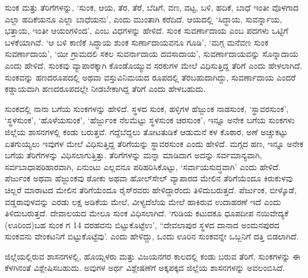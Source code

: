 ಸುಂಕ ಮತ್ತು ತೆರಿಗೆಗಳನ್ನು, ‘ಸುಂಕ, ಆಯ, ತೆರ, ತೆರೆ, ಬೆಡಿಗೆ, ವಣ, ವಟ್ಟ, ಬಳಿ, ಹದಿಕೆ, ಬಾಧೆ ಇಂತೀ ವೊಳಗಾದ ಎಲ್ಲಾ ಹದಿಕೆಯನೂ ಎಲ್ಲಾ ಬಾಧೆಯನು’, ಎಂದು ಮುಂತಾಗಿ ಕರೆದಿದೆ. ಆಯದಲ್ಲಿ ‘ಸಿದ್ಧಾಯ, ಸುವರ್ನ್ನಾಯ, ಭತ್ತಾಯ, ಇಂತೀ ಆಯಂಗಳಿಂದ’, ಎಂಬ ವಿಧಗಳನ್ನು ಹೇಳಿದೆ. ಸುಂಕ ಸುವರ್ಣಾದಾಯ ಎಂಬ ಪದಗಳು ಒಟ್ಟಿಗೆ ಬಳಕೆಯಾಗಿವೆ. ‘ಆ ಬಳಿ ಕಾಣಿಕೆ ಸಿದ್ಧಾಯ ಶುಂಕ ಸುರ್ಣಾದಾಯವನೂ ಗೂಡಿ’, ‘ಮಗ್ಗ ಮನೆವಣ ಸುಂಕ ಸುವರ್ಣಾದಾಯ’, ‘ಯೀ ಗ್ರಾಮದಲಿ ಸಕಲ ಸುವರ್ನಾದಾಯ ದವಸಾದಾಯ’, ಸುವರ್ಣಾದಾಯವನ್ನು ಸೊನ್ನಾದಾಯ ಎಂದು ಹೇಳಿದೆ. ಸುಂಕವು ವ್ಯಾಪಾರಕ್ಕಾಗಿ ಕೊಂಡೊಯ್ಯುವ ಸರಕುಗಳ ಮೇಲೆ ವಿಧಿಸುತ್ತಿದ್ದ ತೆರಿಗೆ ಎಂದು ಹೇಳಲಾಗಿದೆ. ಸುಂಕವನ್ನು ಹಣದರೂಪದಲ್ಲಿ ಅಥವಾ ವಸ್ತುವಿನಿಮಯದ ರೂಪದಲ್ಲಿ ತೆರಬಹುದಾಗಿದ್ದು, ಸುವರ್ಣಾದಾಯ ಎಂದರೆ ಕಡ್ಡಾಯವಾಗಿ ಹಣದರೂಪದಲ್ಲೇ ನೀಡಬೇಕಾಗಿದ್ದ ತೆರಿಗೆ ಎಂದು ಹೇಳಬಹುದು.

ಸುಂಕದಲ್ಲಿ ನಾನಾ ಬಗೆಯ ಸುಂಕಗಳನ್ನು ಹೇಳಿದೆ. ಸ್ಥಳದ ಸುಂಕ, ಹಳ್ಳಿಗಳ ಹೆಜ್ಜುಂಕ ನಾಡಸುಂಕ, ‘ಸ್ಥಾವರಸುಂಕ’, ‘ಸ್ಥಳಸುಂಕ’, ‘ಹೊಳೆಯಸುಂಕ’, ‘ಹೆರ್ಜ್ಜುಂಕ ನೆಲಮೆಟ್ಟು ಸ್ಥಳಸುಂಕ ಚರಸುಂಕ’, ಇನ್ನೂ ಅನೇಕ ಬಗೆಯ ಸುಂಕಗಳು ಜಿಲ್ಲೆಯ ಶಾಸನಗಳಲ್ಲಿ ಕಂಡು ಬರುತ್ತವೆ. ಗದ್ದೆಬೆದ್ದಲು ತೋಟತುಡಿಕೆ ಆಡುಮನೆ ಕಳ ಕೊಠಾರ, ಅಣೆ ಅಚ್ಚುಕಟ್ಟು ಏತಗುಯ್ಯಲು ಇವುಗಳ ಮೇಲೆ ವಿಧಿಸುತ್ತಿದ್ದ ತೆರಿಗೆಯನ್ನು ಸ್ಥಾವರಸುಂಕ ಎಂದು ಹೇಳಿದೆ. ಮಗ್ಗದ ಹಣ, ಇನ್ನೂ ಅನೇಕ ಬಗೆಯ ತೆರಿಗೆಗಳನ್ನು ವಿಧಿಸಲಾಗುತ್ತಿತ್ತು. ತೆರಿಗೆಗಳನ್ನು ಮನ್ನಾ ಮಾಡಿದಾಗ ಅದನ್ನು ಸರ್ವಮಾನ್ಯವಾಗಿ, ಸರ್ವಬಾಧಾಪರಿಹಾರವಾಗಿ, ಏನುಂಟು ಎಲ್ಲವನೂ ಪರಿಹರಿಸಿಕೊಟ್ಟು, ‘ಸರ್ವಾಯಸುದ್ಧವಾಗಿ’ ಎಂದು ಹೇಳಿದೆ. ಪೆರ್ಜುಂಕ ಅಥವಾ ಹೆಜ್ಜುಂಕವು ಠೋಕು ಅಥವಾ ಹೋಲ್​ಸೇಲ್​ ವ್ಯಾಪಾರದ ಮೇಲಿನ ತೆರಿಗೆಯೆಂದೂ ಕಿರುಕುಳವು ಚಿಲ್ಲರೆ ಮಾರಾಟದ ಮೇಲಿನ ತೆರಿಗೆಯೆಂದೂ ರೈಸ್​ರವರು ಹೇಳಿದ್ದಾರೆಂದು ತಿಳಿದುಬರುತ್ತದೆ. ಪೆರ್ಜುಂಕ, ಬೀಳ್ಕೊಡೆ, ವಡ್ಡರಾವುಳವನ್ನು ಎರಡು ಲಕ್ಷ ಅಡಿಕೆಯ ಮೇಲೆ, ವೀಳ್ಯದೆಲೆಯ ಮೇಲೆ ಹಾಕಿರುವ ಉದಾಹರಣೆ ಇದೆ ಎಂದು ತಿಳಿದುಬರುತ್ತದೆ. ದೇವಾಲಯದ ಮೇಲೂ ಸುಂಕ ವಿಧಿಸಲಾಗಿದೆ. ‘ಗುಡಿಯ ಕಟುದಕೂ ಧೂಪದೀಪ ನಯಿವೇದ್ಯಕೆ (ಊರಿಂದ)ಬಹ ಸುಂಕ ಗ 14 ವರಹವನು ಬಿಟ್ಟುಕೊಟ್ಟೆಉ’, “ದೇವಲಾಪುರ ಸ್ಥಳದ ದಾನಾದ ಅಂಮನಪುರದ ಸುಂಕವನು ವೇಂಕಟನಿಗೆ ಬಿಟ್ಟುಕೊಟ್ಟೆವು’. ಎಂದು ಹೇಳಿದ್ದು, ಒಂದು ಊರಿನ ಸುಂಕವನ್ನೇ ಒಬ್ಬನಿಗೆ ದತ್ತಿ ಬಿಡಲಾಗಿದೆ.

ಜಿಲ್ಲೆಯಲ್ಲಿರುವ ಶಾಸನಗಳಲ್ಲಿ, ಹೊಯ್ಸಳರು ಮತ್ತು ವಿಜಯನಗರ ಕಾಲದಲ್ಲಿ ಕಂಡು ಬರುವ ತೆರಿಗೆ, ಸುಂಕಗಳನ್ನು ಈ ಕೆಳಗಿನಂತೆ ವಿಶ್ಲೇಷಿಸಬಹುದು. ಅವುಗಳ ಅರ್ಥ ವಿಶ್ಲೇಷಣೆಗೆ ಅಕ್ಕಪಕ್ಕದ ಜಿಲ್ಲೆಯ ಶಾಸನಗಳನ್ನು ಅವಲಂಬಿಸಿದೆ.

